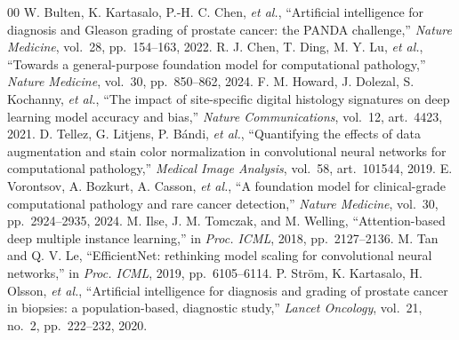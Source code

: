 \documentclass[conference]{IEEEtran}
\begin{document}
\begin{thebibliography}{00}
 W. Bulten, K. Kartasalo, P.-H. C. Chen, \textit{et al.},
``Artificial intelligence for diagnosis and Gleason grading of prostate cancer: the
PANDA challenge,'' \textit{Nature Medicine}, vol.~28, pp.~154--163, 2022.
 R. J. Chen, T. Ding, M. Y. Lu, \textit{et al.}, ``Towards a
general-purpose foundation model for computational pathology,'' \textit{Nature
Medicine}, vol.~30, pp.~850--862, 2024.
 F. M. Howard, J. Dolezal, S. Kochanny, \textit{et al.}, ``The
impact of site-specific digital histology signatures on deep learning model
accuracy and bias,'' \textit{Nature Communications}, vol.~12, art.~4423, 2021.
 D. Tellez, G. Litjens, P. B\'andi, \textit{et al.}, ``Quantifying
the effects of data augmentation and stain color normalization in convolutional
neural networks for computational pathology,'' \textit{Medical Image Analysis},
vol.~58, art.~101544, 2019.
 E. Vorontsov, A. Bozkurt, A. Casson, \textit{et al.}, ``A
foundation model for clinical-grade computational pathology and rare cancer
detection,'' \textit{Nature Medicine}, vol.~30, pp.~2924--2935, 2024.
 M. Ilse, J. M. Tomczak, and M. Welling, ``Attention-based deep
multiple instance learning,'' in \textit{Proc. ICML}, 2018, pp.~2127--2136.
 M. Tan and Q. V. Le, ``EfficientNet: rethinking model scaling for
convolutional neural networks,'' in \textit{Proc. ICML}, 2019, pp.~6105--6114.
 P. Str\"om, K. Kartasalo, H. Olsson, \textit{et al.},
``Artificial intelligence for diagnosis and grading of prostate cancer in biopsies:
a population-based, diagnostic study,'' \textit{Lancet Oncology}, vol.~21, no.~2,
pp.~222--232, 2020.

\end{thebibliography}
\end{document}
